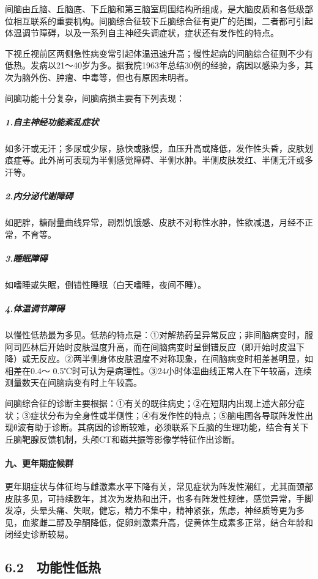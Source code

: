 间脑由丘脑、丘脑底、下丘脑和第三脑室周围结构所组成，是大脑皮质和各低级部位相互联系的重要机构。间脑综合征较下丘脑综合征有更广的范围，二者都可引起体温调节障碍，以及一系列自主神经失调症状，症状还有发作性的特点。

下视丘视前区两侧急性病变常引起体温迅速升高；慢性起病的间脑综合征则不少有低热。发病以21～40岁为多。据我院1963年总结30例的经验，病因以感染为多，其次为脑外伤、肿瘤、中毒等，但也有原因未明者。

间脑功能十分复杂，间脑病损主要有下列表现：

\subparagraph{1.自主神经功能紊乱症状}

如多汗或无汗；多尿或少尿，脉快或脉慢，血压升高或降低，发作性头昏，皮肤划痕症等。此外尚可表现为半侧感觉障碍、半侧水肿。半侧皮肤发红、半侧无汗或多汗等。

\subparagraph{2.内分泌代谢障碍}

如肥胖，糖耐量曲线异常，剧烈饥饿感、皮肤不对称性水肿，性欲减退，月经不正常，不育等。

\subparagraph{3.睡眠障碍}

如嗜睡或失眠，倒错性睡眠（白天嗜睡，夜间不睡）。

\subparagraph{4.体温调节障碍}

以慢性低热最为多见。低热的特点是：①对解热药呈异常反应；非间脑病变时，服阿司匹林后开始时皮肤温度升高，而在间脑病变时呈倒错反应（即开始时皮温下降）或无反应。②两半侧身体皮肤温度不对称现象，在间脑病变时相差甚明显，如相差在0.4～
0.5℃时可认为是病理性。③24小时体温曲线正常人在下午较高，连续测量数天在间脑病变有时上午较高。

间脑综合征的诊断主要根据：①有关的既往病史；②在短期内出现上述大部分症状；③症状分布为全身性或半侧性；④有发作性的特点；⑤脑电图各导联阵发性出现θ波有助于诊断。其病因的诊断较难，必须联系下丘脑的生理功能，结合有关下丘脑靶腺反馈机制，头颅CT和磁共振等影像学特征作出诊断。

\paragraph{九、更年期症候群}

更年期症状与体征均与雌激素水平下降有关，常见症状为阵发性潮红，尤其面颈部皮肤多见，可持续数年，其次为发热和出汗，也多有阵发性规律，感觉异常，手脚发凉，头晕头痛、失眠，健忘，精力不集中，精神紧张，焦虑，神经质等更为多见，血浆雌二醇及孕酮降低，促卵刺激素升高，促黄体生成素多正常，结合年龄和闭经史诊断较易。

\protect\hypertarget{text00041.html}{}{}

\subsection{6.2　功能性低热}

